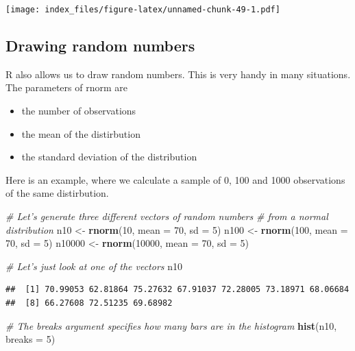 \documentclass[]{article}
\newenvironment{Shaded}{\begin{snugshade}}{\end{snugshade}}
\newcommand{\CommentTok}[1]{\textcolor[rgb]{0.56,0.35,0.01}{\textit{#1}}}
\newcommand{\DataTypeTok}[1]{\textcolor[rgb]{0.13,0.29,0.53}{#1}}
\newcommand{\DecValTok}[1]{\textcolor[rgb]{0.00,0.00,0.81}{#1}}
\newcommand{\KeywordTok}[1]{\textcolor[rgb]{0.13,0.29,0.53}{\textbf{#1}}}
\newcommand{\NormalTok}[1]{#1}
\newcommand{\StringTok}[1]{\textcolor[rgb]{0.31,0.60,0.02}{#1}}
\begin{document}
\texttt{[image: index\_files/figure-latex/unnamed-chunk-49-1.pdf]}

\hypertarget{drawing-random-numbers}{%
\subsection{Drawing random numbers}\label{drawing-random-numbers}}

R also allows us to draw random numbers. This is very handy in many
situations. The parameters of rnorm are

\begin{itemize}
\item
  the number of observations
\item
  the mean of the distirbution
\item
  the standard deviation of the distribution
\end{itemize}

Here is an example, where we calculate a sample of 0, 100 and 1000
observations of the same distirbution.

\begin{Shaded}
\begin{Highlighting}[]
\CommentTok{# Let's generate three different vectors of random numbers }
\CommentTok{# from a normal  distribution}
\NormalTok{n10 <-}\StringTok{ }\KeywordTok{rnorm}\NormalTok{(}\DecValTok{10}\NormalTok{, }\DataTypeTok{mean =} \DecValTok{70}\NormalTok{, }\DataTypeTok{sd =} \DecValTok{5}\NormalTok{)}
\NormalTok{n100 <-}\StringTok{ }\KeywordTok{rnorm}\NormalTok{(}\DecValTok{100}\NormalTok{, }\DataTypeTok{mean =} \DecValTok{70}\NormalTok{, }\DataTypeTok{sd =} \DecValTok{5}\NormalTok{)}
\NormalTok{n10000 <-}\StringTok{  }\KeywordTok{rnorm}\NormalTok{(}\DecValTok{10000}\NormalTok{, }\DataTypeTok{mean =} \DecValTok{70}\NormalTok{, }\DataTypeTok{sd =} \DecValTok{5}\NormalTok{)}

\CommentTok{# Let's just look at one of the vectors}
\NormalTok{n10}
\end{Highlighting}
\end{Shaded}

\begin{verbatim}
##  [1] 70.99053 62.81864 75.27632 67.91037 72.28005 73.18971 68.06684
##  [8] 66.27608 72.51235 69.68982
\end{verbatim}

\begin{Shaded}
\begin{Highlighting}[]
\CommentTok{# The breaks argument specifies how many bars are in the histogram}
\KeywordTok{hist}\NormalTok{(n10, }\DataTypeTok{breaks =} \DecValTok{5}\NormalTok{)}
\end{Highlighting}
\end{Shaded}
\end{document}
